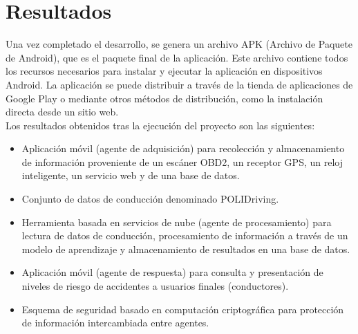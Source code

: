 \documentclass[a4paper,10pt, oneside, titlepage]{article}
\begin{document}
	\section{Resultados}
	Una vez completado el desarrollo, se genera un archivo APK (Archivo de Paquete de Android), que es el paquete final de la aplicación. Este archivo contiene todos los recursos necesarios para instalar y ejecutar la aplicación en dispositivos Android. La aplicación se puede distribuir a través de la tienda de aplicaciones de Google Play o mediante otros métodos de distribución, como la instalación directa desde un sitio web. \\\newline
	\indent Los resultados obtenidos tras la ejecución del proyecto son las siguientes:
	\begin{itemize}
		\item Aplicación móvil (agente de adquisición) para recolección y almacenamiento de información proveniente de un escáner OBD2, un receptor GPS, un reloj inteligente, un servicio web y de una base de datos.
		\item Conjunto de datos de conducción denominado POLIDriving.
		\item Herramienta basada en servicios de nube (agente de procesamiento) para lectura de datos de conducción, procesamiento de información a través de un modelo de aprendizaje y almacenamiento de resultados en una base de datos.
		\item Aplicación móvil (agente de respuesta) para consulta y presentación de niveles de riesgo de accidentes a usuarios finales (conductores).
		\item Esquema de seguridad basado en computación criptográfica para protección de información intercambiada entre agentes.
	\end{itemize}
	
\end{document}
